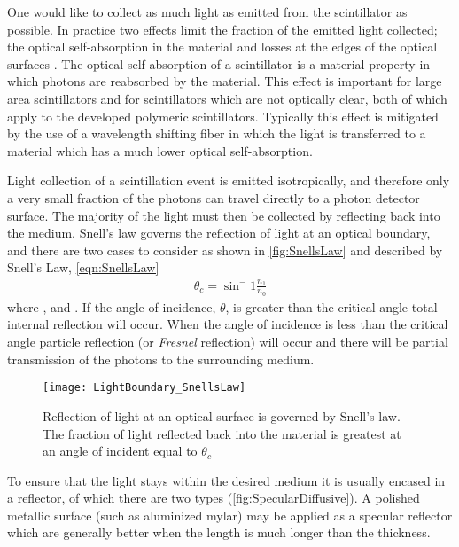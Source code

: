 One would like to collect as much light as emitted from the scintillator as possible.
In practice two effects limit the fraction of the emitted light collected; the optical self-absorption in the material and losses at the edges of the optical surfaces \cite{knoll_radiation_2009}.
The optical self-absorption of a scintillator is a material property in which photons are reabsorbed by the material.
This effect is important for large area scintillators and for scintillators which are not optically  clear, both of which apply to the developed polymeric scintillators.
Typically this effect is mitigated by the use of a wavelength shifting fiber in which the light is transferred to a material which has a much lower optical self-absorption.

Light collection of a scintillation event is emitted isotropically, and therefore only a very small fraction of the photons can travel directly to a photon detector surface.
The majority of the light must then be collected by reflecting back into the medium.
Snell's law governs the reflection of light at an optical boundary, and there are two cases to consider as shown in \autoref{fig:SnellsLaw} and described by Snell's Law, \eqref{eqn:SnellsLaw}
\begin{align}
	\theta_c = \sin^-1 \frac{n_1}{n_0}
	\label{eqn:SnellsLaw}
\end{align}
where ,  and .
If the angle of incidence, $\theta$, is greater than the critical angle total internal reflection will occur.
When the angle of incidence is less than the critical angle particle reflection (or \textit{Fresnel} reflection) will occur and there will be partial transmission of the photons to the surrounding medium.
\begin{figure}
	\centering
	\texttt{[image: LightBoundary\_SnellsLaw]}
	\caption[Light Reflection at a Boundary]{Reflection of light at an optical surface is governed by Snell's law.  The fraction of light reflected back into the material is greatest at an angle of incident equal to $\theta_c$}
	\label{fig:SnellsLaw}
\end{figure}
To ensure that the light stays within the desired medium it is usually encased in a reflector, of which there are two types (\autoref{fig:SpecularDiffusive}).
A polished metallic surface (such as aluminized mylar) may be applied as a specular reflector which are generally better when the length is much longer than the thickness\cite{SaintGobain_DAM_2012}.
